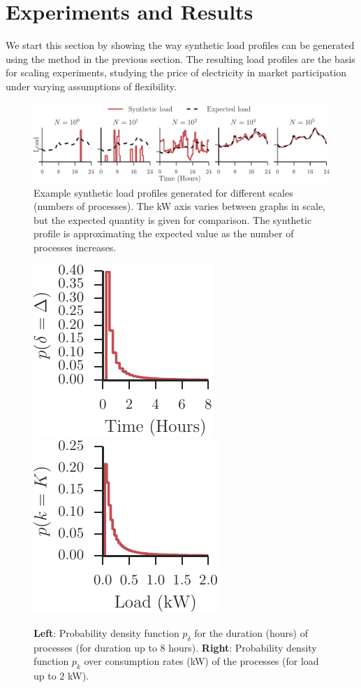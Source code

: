 \documentclass[conference]{IEEEtran}
\begin{document}

\section{Experiments and Results}
\label{sec:Experiments}
We start this section by showing the way synthetic load profiles can be generated using the method in the previous section. The resulting load profiles are the basis for scaling experiments, studying the price of electricity in market participation under varying assumptions of flexibility.


\begin{figure}[t!]
\centering
\includegraphics[]{figures/slps.pdf}
\caption{Example synthetic load profiles generated for different scales (numbers of processes). The kW axis varies between graphs in scale, but the expected quantity is given for comparison. The synthetic profile is approximating the expected value as the number of processes increases.}
\label{fig:art_slps}
\vspace{-0.5cm}
\end{figure}

\begin{figure}[t!]
\centering
\includegraphics[width=0.35\columnwidth]{figures/delta.pdf}~\includegraphics[width=0.35\columnwidth]{figures/kappa.pdf}
\caption{\textbf{Left}: Probability density function $p_{\delta}$ for the duration (hours) of processes (for duration up to $8$ hours). \textbf{Right}: Probability density function $p_k$ over consumption rates (kW) of the processes (for load up to $2$ kW).}
\label{fig:devide-time-consumption}
\end{figure}
\end{document}
